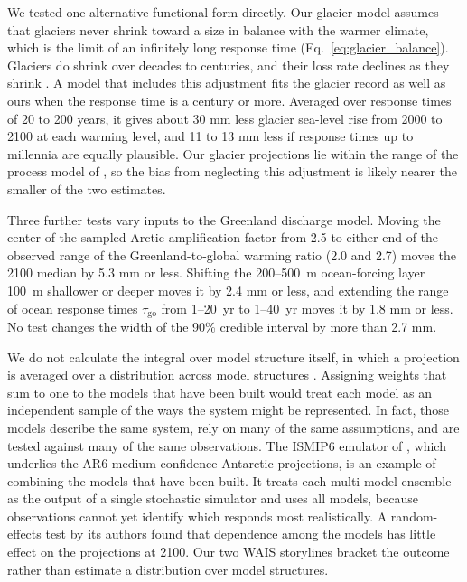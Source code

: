 \documentclass[draft,linenumbers]{agujournal2025}
\begin{document}
We tested one alternative functional form directly. Our glacier model assumes that glaciers never shrink toward a size in balance with the warmer climate, which is the limit of an infinitely long response time (Eq.~\ref{eq:glacier_balance}). Glaciers do shrink over decades to centuries, and their loss rate declines as they shrink \citep{Roe2021}. A model that includes this adjustment fits the glacier record as well as ours when the response time is a century or more. Averaged over response times of 20 to 200 years, it gives about 30 mm less glacier sea-level rise from 2000 to 2100 at each warming level, and 11 to 13 mm less if response times up to millennia are equally plausible. Our glacier projections lie within the range of the process model of \citet{Rounce2023}, so the bias from neglecting this adjustment is likely nearer the smaller of the two estimates. 

Three further tests vary inputs to the Greenland discharge model. Moving the center of the sampled Arctic amplification factor from 2.5 to either end of the observed range of the Greenland-to-global warming ratio (2.0 and 2.7) moves the 2100 median by 5.3 mm or less. Shifting the 200--500~m ocean-forcing layer 100~m shallower or deeper moves it by 2.4 mm or less, and extending the range of ocean response times $\tau_{\mathrm{go}}$ from 1--20~yr to 1--40~yr moves it by 1.8 mm or less. No test changes the width of the 90\% credible interval by more than 2.7 mm.

We do not calculate the integral over model structure itself, in which a projection is averaged over a distribution across model structures \citep{Aschwanden2021}. Assigning weights that sum to one to the models that have been built would treat each model as an independent sample of the ways the system might be represented. In fact, those models describe the same system, rely on many of the same assumptions, and are tested against many of the same observations. The ISMIP6 emulator of \citet{Edwards2021}, which underlies the AR6 medium-confidence Antarctic projections, is an example of combining the models that have been built. It treats each multi-model ensemble as the output of a single stochastic simulator and uses all models, because observations cannot yet identify which responds most realistically. A random-effects test by its authors found that dependence among the models has little effect on the projections at 2100. Our two WAIS storylines bracket the outcome rather than estimate a distribution over model structures.
\end{document}
